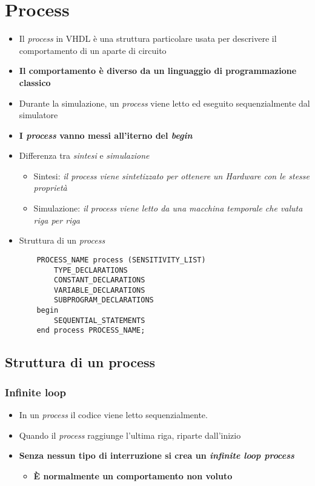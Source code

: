 \documentclass{article}
\begin{document}
\newpage

\section{Process}
\begin{itemize}
	\item Il \textit{process} in VHDL è una struttura particolare usata per descrivere il comportamento di un aparte di circuito
	\item \textbf{Il comportamento è diverso da un linguaggio di programmazione classico}
	\item Durante la simulazione, un \textit{process} viene letto ed eseguito sequenzialmente dal simulatore
	\item \textbf{I \textit{process} vanno messi all'iterno del \textit{begin}}
	\item Differenza tra \textit{sintesi} e \textit{simulazione}
	      \begin{itemize}
	      	\item Sintesi: \textit{il process viene sintetizzato per ottenere un Hardware con le stesse proprietà}
	      	\item Simulazione: \textit{il process viene letto da una macchina temporale che valuta riga per riga}
	      \end{itemize}
	\item Struttura di un \textit{process}
	      \begin{verbatim}
    PROCESS_NAME process (SENSITIVITY_LIST)
        TYPE_DECLARATIONS
        CONSTANT_DECLARATIONS
        VARIABLE_DECLARATIONS
        SUBPROGRAM_DECLARATIONS
    begin
        SEQUENTIAL_STATEMENTS
    end process PROCESS_NAME;
	      \end{verbatim}
\end{itemize}
\subsection{Struttura di un process}
\subsubsection{Infinite loop}
\begin{itemize}
	\item In un \textit{process} il codice viene letto sequenzialmente.
	\item Quando il \textit{process} raggiunge l'ultima riga, riparte dall'inizio
	\item \textbf{Senza nessun tipo di interruzione si crea un \textit{infinite loop process}}
	\begin{itemize}
		\item \textbf{\`E normalmente un comportamento non voluto}
	\end{itemize}
\end{itemize}
\end{document}
